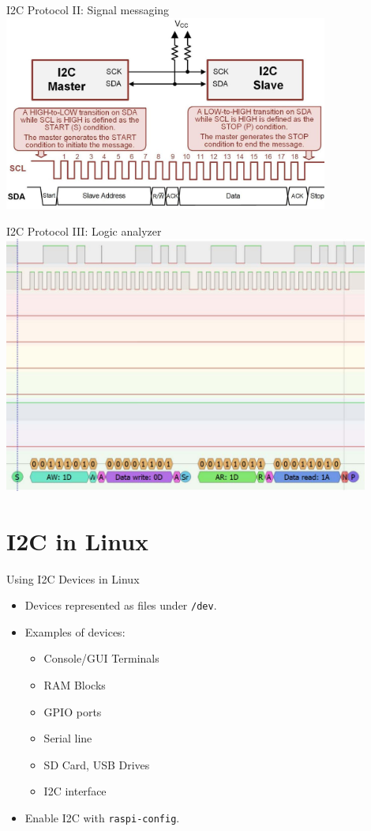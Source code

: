 \begin{frame}{I2C Protocol II: Signal messaging}
        \includegraphics[width=0.8\textwidth]{trainingmaterials/i2c/i2c-signals.jpg}
\end{frame}

\begin{frame}{I2C Protocol III: Logic analyzer}
        \includegraphics[width=0.9\textwidth]{trainingmaterials/i2c/i2c-signal-logic-analyzer.jpg}
\end{frame}

\section{I2C in Linux}
\begin{frame}{Using I2C Devices in Linux}
    \begin{itemize}
        \item Devices represented as files under \texttt{/dev}.
        \item Examples of devices:
        \begin{itemize}
            \item Console/GUI Terminals
            \item RAM Blocks
            \item GPIO ports
            \item Serial line
            \item SD Card, USB Drives
            \item I2C interface
        \end{itemize}
        \item Enable I2C with \texttt{raspi-config}.
    \end{itemize}
\end{frame}

